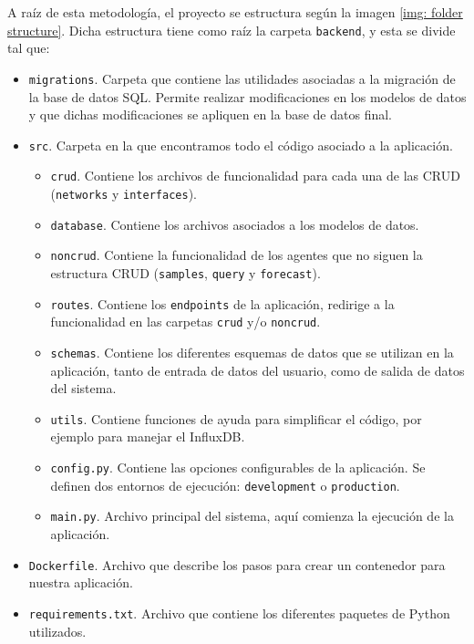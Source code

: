\documentclass[a4paper, oneside, 12pt]{book}
\begin{document}
	\noindent A raíz de esta metodología, el proyecto se estructura según la imagen \ref{img: folder structure}. Dicha estructura tiene como raíz la carpeta \texttt{backend}, y esta se divide tal que:
	
	\begin{itemize}
		\item \texttt{migrations}. Carpeta que contiene las utilidades asociadas a la migración de la base de datos SQL. Permite realizar modificaciones en los modelos de datos y que dichas modificaciones se apliquen en la base de datos final.
		\item \texttt{src}. Carpeta en la que encontramos todo el código asociado a la aplicación.
			\begin{itemize}
				\item \texttt{crud}. Contiene los archivos de funcionalidad para cada una de las CRUD (\texttt{networks} y \texttt{interfaces}).
				\item \texttt{database}. Contiene los archivos asociados a los modelos de datos.
				\item \texttt{noncrud}. Contiene la funcionalidad de los agentes que no siguen la estructura CRUD (\texttt{samples}, \texttt{query} y \texttt{forecast}).
				\item \texttt{routes}. Contiene los \texttt{endpoints} de la aplicación, redirige a la funcionalidad en las carpetas \texttt{crud} y/o \texttt{noncrud}.
				\item \texttt{schemas}. Contiene los diferentes esquemas de datos que se utilizan en la aplicación, tanto de entrada de datos del usuario, como de salida de datos del sistema.
				\item \texttt{utils}. Contiene funciones de ayuda para simplificar el código, por ejemplo para manejar el InfluxDB.
				\item \texttt{config.py}. Contiene las opciones configurables de la aplicación. Se definen dos entornos de ejecución: \texttt{development} o \texttt{production}.
				\item \texttt{main.py}. Archivo principal del sistema, aquí comienza la ejecución de la aplicación.
			\end{itemize}
		
		\item \texttt{Dockerfile}. Archivo que describe los pasos para crear un contenedor para nuestra aplicación.
		\item \texttt{requirements.txt}. Archivo que contiene los diferentes paquetes de Python utilizados.
	\end{itemize}
	
\end{document}
